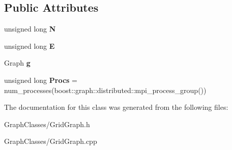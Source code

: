 \subsection*{Public Attributes}
\begin{DoxyCompactItemize}
\item 
\mbox{\label{classGridGraphObject_a3cea5ec4a465d4316d40779980fe306b}} 
unsigned long {\bfseries N}
\item 
\mbox{\label{classGridGraphObject_adfe178e009545f42ef05a13322431f09}} 
unsigned long {\bfseries E}
\item 
\mbox{\label{classGridGraphObject_a5781cceddb234c716fbbfa88c5b4228f}} 
Graph {\bfseries g}
\item 
\mbox{\label{classGridGraphObject_a4d72f7ab2ffd20ea529d0013cc6b2394}} 
unsigned long {\bfseries Procs} = num\+\_\+processes(boost\+::graph\+::distributed\+::mpi\+\_\+process\+\_\+group())
\end{DoxyCompactItemize}


The documentation for this class was generated from the following files\+:\begin{DoxyCompactItemize}
\item 
Graph\+Classes/Grid\+Graph.\+h\item 
Graph\+Classes/Grid\+Graph.\+cpp\end{DoxyCompactItemize}
